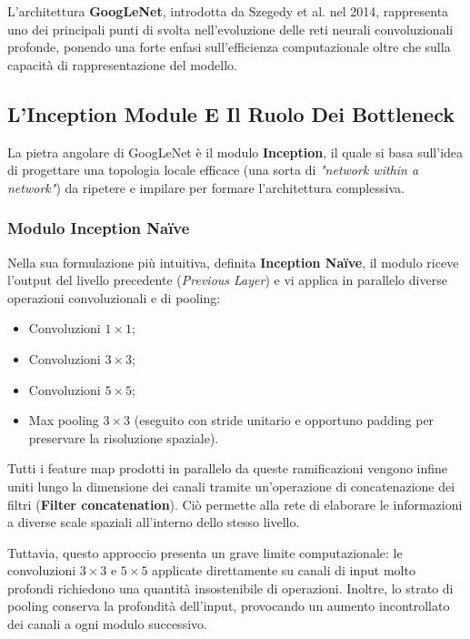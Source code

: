 ﻿\documentclass[11pt, a4paper]{article}
\begin{document}
L'architettura \textbf{GoogLeNet}, introdotta da Szegedy et al. nel 2014, rappresenta uno dei principali punti di svolta nell'evoluzione delle reti neurali convoluzionali profonde, ponendo una forte enfasi sull'efficienza computazionale oltre che sulla capacità di rappresentazione del modello.

\subsection{L'Inception Module E Il Ruolo Dei Bottleneck}

La pietra angolare di GoogLeNet è il modulo \textbf{Inception}, il quale si basa sull'idea di progettare una topologia locale efficace (una sorta di \emph{"network within a network"}) da ripetere e impilare per formare l'architettura complessiva.

\subsubsection{Modulo Inception Naïve}

Nella sua formulazione più intuitiva, definita \textbf{Inception Naïve}, il modulo riceve l'output del livello precedente (\emph{Previous Layer}) e vi applica in parallelo diverse operazioni convoluzionali e di pooling:
\begin{itemize}
    \item Convoluzioni $1\times1$;
    \item Convoluzioni $3\times3$;
    \item Convoluzioni $5\times5$;
    \item Max pooling $3\times3$ (eseguito con stride unitario e opportuno padding per preservare la risoluzione spaziale).
\end{itemize}
Tutti i feature map prodotti in parallelo da queste ramificazioni vengono infine uniti lungo la dimensione dei canali tramite un'operazione di concatenazione dei filtri (\textbf{Filter concatenation}). Ciò permette alla rete di elaborare le informazioni a diverse scale spaziali all'interno dello stesso livello.

Tuttavia, questo approccio presenta un grave limite computazionale: le convoluzioni $3\times3$ e $5\times5$ applicate direttamente su canali di input molto profondi richiedono una quantità insostenibile di operazioni. Inoltre, lo strato di pooling conserva la profondità dell'input, provocando un aumento incontrollato dei canali a ogni modulo successivo.

\end{document}
